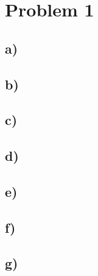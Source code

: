 \newpage
\section*{Problem 1}
\subsection*{a)}
\subsection*{b)}
\subsection*{c)}
\subsection*{d)}
\subsection*{e)}
\subsection*{f)}
\subsection*{g)}